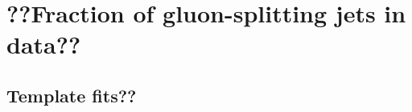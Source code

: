 %
%
\chapter{??Fraction of gluon-splitting jets in data??}

\section{Template fits??}\label{sec:FractionSystematics}

